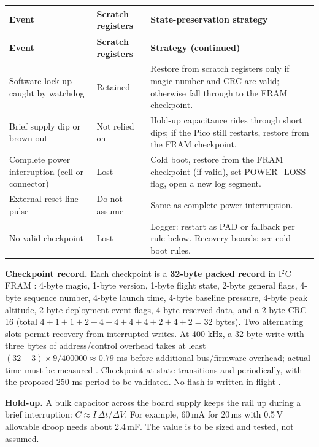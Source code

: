 \small
\begingroup
{}
\begin{longtable}{@{}L{35mm}L{36mm}L{70mm}@{}}
\toprule{}\textbf{Event}&\textbf{Scratch registers}&\textbf{State-preservation strategy}\\\midrule\endfirsthead
\toprule{}\textbf{Event}&\textbf{Scratch registers}&\textbf{Strategy (continued)}\\\midrule\endhead
\bottomrule\endlastfoot
Software lock-up caught by watchdog & Retained \cite{rp2040ds} & Restore from scratch registers only if magic number and CRC are valid; otherwise fall through to the FRAM checkpoint.\\
Brief supply dip or brown-out & Not relied on & Hold-up capacitance rides through short dips; if the Pico still restarts, restore from the FRAM checkpoint.\\
Complete power interruption (cell or connector) & Lost & Cold boot, restore from the FRAM checkpoint (if valid), set POWER\_LOSS flag, open a new log segment.\\
External reset line pulse & Do not assume & Same as complete power interruption.\\
No valid checkpoint & Lost & Logger: restart as PAD or fallback per rule below. Recovery boards: see cold-boot rules.\\
\end{longtable}
\endgroup %
\normalsize

\textbf{Checkpoint record.} Each checkpoint is a \textbf{32-byte packed record} in I$^2$C FRAM \cite{fram}: 4-byte magic, 1-byte version, 1-byte flight state, 2-byte general flags, 4-byte sequence number, 4-byte launch time, 4-byte baseline pressure, 4-byte peak altitude, 2-byte deployment event flags, 4-byte reserved data, and a 2-byte CRC-16 (total $4+1+1+2+4+4+4+4+2+4+2=32$ bytes). Two alternating slots permit recovery from interrupted writes. At 400 kHz, a 32-byte write with three bytes of address/control overhead takes at least $(32+3)\times9/400000\approx0.79$ ms before additional bus/firmware overhead; actual time must be measured \cite{i2cspec}. Checkpoint at state transitions and periodically, with the proposed 250 ms period to be validated. No flash is written in flight \cite{rp2040ds}.

\textbf{Hold-up.} A bulk capacitor across the board supply keeps the rail up during a brief interruption: $C\approx I\,\Delta t/\Delta V$. For example, 60\,mA for 20\,ms with 0.5\,V allowable droop needs about 2.4\,mF. The value is to be sized and tested, not assumed.


